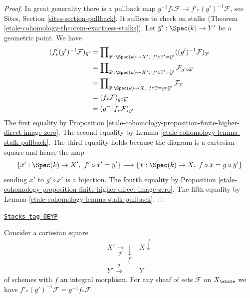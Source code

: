\begin{proof}
In great generality there is a pullback map
$g^{-1}f_*\mathcal{F} \to f'_*(g')^{-1}\mathcal{F}$, see
Sites, Section \ref{sites-section-pullback}.
It suffices to check on stalks (Theorem \ref{etale-cohomology-theorem-exactness-stalks}).
Let $\overline{y}' : \Spec(k) \to Y'$ be a geometric point.
We have
\begin{align*}
(f'_*(g')^{-1}\mathcal{F})_{\overline{y}'}
& =
\prod\nolimits_{\overline{x}' : \Spec(k) \to X',\ f' \circ \overline{x}' =
\overline{y}'}
((g')^{-1}\mathcal{F})_{\overline{x}'} \\
& =
\prod\nolimits_{\overline{x}' : \Spec(k) \to X',\ f' \circ \overline{x}' =
\overline{y}'} \mathcal{F}_{g' \circ \overline{x}'} \\
& =
\prod\nolimits_{\overline{x} : \Spec(k) \to X,\ f \circ \overline{x} =
g \circ \overline{y}'} \mathcal{F}_{\overline{x}} \\
& =
(f_*\mathcal{F})_{g \circ \overline{y}'} \\
& =
(g^{-1}f_*\mathcal{F})_{\overline{y}'}
\end{align*}
The first equality by
Proposition \ref{etale-cohomology-proposition-finite-higher-direct-image-zero}.
The second equality by
Lemma \ref{etale-cohomology-lemma-stalk-pullback}.
The third equality holds because the diagram is a cartesian square
and hence the map
$$
\{\overline{x}' : \Spec(k) \to X',\ f' \circ \overline{x}' =
\overline{y}'\}
\longrightarrow
\{\overline{x} : \Spec(k) \to X,\ f \circ \overline{x} =
g \circ \overline{y}'\}
$$
sending $\overline{x}'$ to $g' \circ \overline{x}'$ is a bijection.
The fourth equality by
Proposition \ref{etale-cohomology-proposition-finite-higher-direct-image-zero}.
The fifth equality by
Lemma \ref{etale-cohomology-lemma-stalk-pullback}.
\end{proof}

\begin{lemma}
\label{etale-cohomology-lemma-integral-pushforward-commutes-with-base-change}
\href{https://stacks.math.columbia.edu/tag/0EYP}{\texttt{Stacks tag 0EYP}}

Consider a cartesian square
$$
\begin{array}{cc}X' \underset{g'}{\longrightarrow}\underset{f'}{\downarrow} & X \overset{f}{\downarrow} \\ Y' \overset{g}{\longrightarrow} & Y\end{array}
$$
of schemes with $f$ an integral morphism.
For any sheaf of sets $\mathcal{F}$ on $X_\etale$ we have
$f'_*(g')^{-1}\mathcal{F} = g^{-1}f_*\mathcal{F}$.
\end{lemma}

